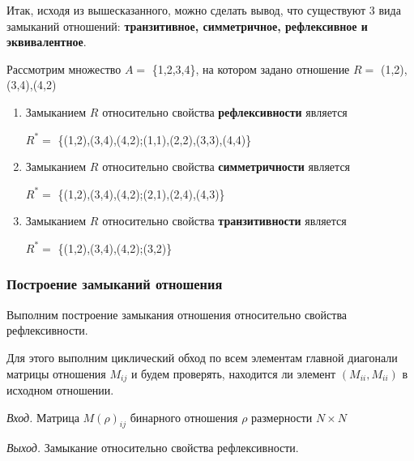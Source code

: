 \documentclass[bachelor, och, labwork]{shiza}
\begin{document}
Итак, исходя из вышесказанного, можно сделать вывод, что существуют 3 вида 
замыканий отношений: \textbf{транзитивное, симметричное, рефлексивное и
эквивалентное}.

Рассмотрим множество $A=$ \{1,2,3,4\}, на котором задано отношение 
$R=$ {(1,2),(3,4),(4,2)} 

\begin{enumerate}

    \item Замыканием $R$ относительно свойства \textbf{рефлексивности} является     
        \begin{center}

            $R^*=$ \{(1,2),(3,4),(4,2);(1,1),(2,2),(3,3),(4,4)\} 
        
        \end{center}
  
    \item Замыканием $R$ относительно свойства \textbf{симметричности} является 
        \begin{center}
    
            $R^*=$ \{(1,2),(3,4),(4,2);(2,1),(2,4),(4,3)\} 
    
        \end{center}
  
    \item Замыканием $R$ относительно свойства \textbf{транзитивности} является 
        \begin{center}
        
            $R^*=$ \{(1,2),(3,4),(4,2);(3,2)\} 
        
        \end{center}
    
    
\end{enumerate}

\subsubsection{Построение замыканий отношения}

Выполним построение замыкания отношения относительно свойства 
рефлексивности.

Для этого выполним циклический обход по всем элементам главной диагонали 
матрицы отношения $M_{ij}$ и будем проверять, находится ли элемент 
$(M_{ii},M_{ii})$ в исходном отношении.

\textit{Вход.} Матрица $M(\rho)_{ij}$ бинарного отношения $\rho$ размерности
$N \times N$

\textit{Выход.} Замыкание относительно свойства рефлексивности.
\end{document}
